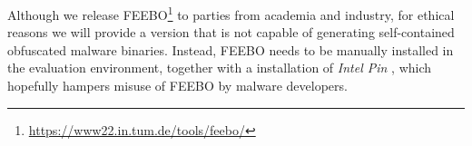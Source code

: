 \documentclass{llncs}
\begin{document}
Although we release FEEBO\footnote{\url{https://www22.in.tum.de/tools/feebo/}} to parties from academia and industry, for ethical reasons we will provide a version that is not capable of generating self-contained obfuscated malware binaries. Instead, FEEBO needs to be manually installed in the evaluation environment, together with a installation of \emph{Intel Pin} \cite{reddi2004pin}, which hopefully hampers misuse of FEEBO by malware developers.

 

 
\end{document}
